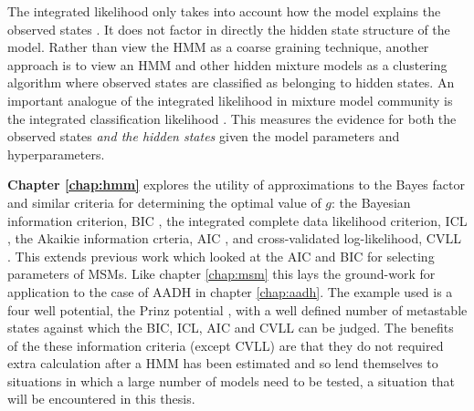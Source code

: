 The integrated likelihood only takes into account how the model explains the observed states \cite{biernackiAssessingMixtureModel2000a,mclachlanFiniteMixtureModels2000}. It does not factor in directly the hidden state structure of the model. Rather than view the HMM as a coarse graining technique, another approach is to view an HMM and other hidden mixture models as a clustering algorithm \cite{mclachlanFiniteMixtureModels2000} where observed states are classified as belonging to hidden states. An important analogue of the integrated likelihood in mixture model community is the integrated classification likelihood \cite{mclachlanFiniteMixtureModels2000}. This measures the evidence for  both the observed states \emph{and the hidden states} given the model parameters and hyperparameters. 

\textbf{Chapter \ref{chap:hmm}} explores the utility of approximations to the Bayes factor and similar criteria for determining the optimal value of $g$: the Bayesian information criterion, BIC \cite{schwarzEstimatingDimensionModel1978a}, the integrated complete data likelihood criterion, ICL \cite{biernackiAssessingMixtureModel2000a}, the Akaikie information crteria, AIC \cite{akaikeInformationTheoryExtension1998}, and cross-validated log-likelihood, CVLL \cite{celeuxSelectingHiddenMarkov2008}. This extends previous work \cite{mcgibbonStatisticalModelSelection2014a} which looked at the AIC and BIC for selecting parameters of MSMs. Like chapter \ref{chap:msm} this lays the ground-work for application to the case of AADH in chapter \ref{chap:aadh}. The example used is a four well potential, the Prinz potential \cite{prinzMarkovModelsMolecular2011}, with a well defined number of metastable states against which the BIC, ICL, AIC and CVLL can be judged. The benefits of the these information criteria (except CVLL) are that they do not required extra calculation after a HMM has been estimated and so lend themselves to situations in which a large number of models need to be tested, a situation that will be encountered in this thesis. 

